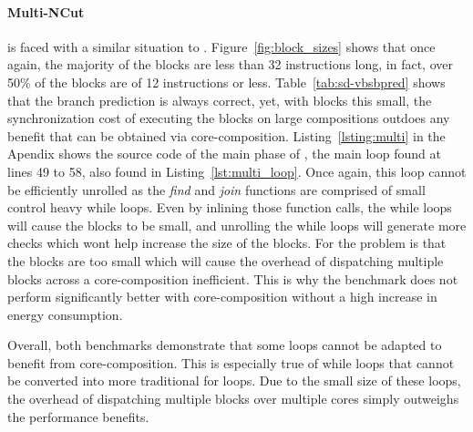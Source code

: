 \paragraph*{Multi-NCut}
 is faced with a similar situation to .
Figure~\ref{fig:block_sizes} shows that once again, the majority of the blocks are less than 32 instructions long, in fact, over 50\% of the blocks are of 12 instructions or less.
Table~\ref{tab:sd-vbsbpred} shows that the branch prediction is always correct, yet, with blocks this small, the synchronization cost of executing the blocks on large compositions outdoes any benefit that can be obtained via core-composition.
Listing~\ref{lsting:multi} in the Apendix shows the source code of the main phase of , the main loop found at lines 49 to 58, also found in Listing~\ref{lst:multi_loop}.
Once again, this loop cannot be efficiently unrolled as the \textit{find} and \textit{join} functions are comprised of small control heavy while loops.
Even by inlining those function calls, the while loops will cause the blocks to be small, and unrolling the while loops will generate more checks which wont help increase the size of the blocks.
For  the problem is that the blocks are too small which will cause the overhead of dispatching multiple blocks across a core-composition inefficient.
This is why the benchmark does not perform significantly better with core-composition without a high increase in energy consumption.

Overall, both benchmarks demonstrate that some loops cannot be adapted to benefit from core-composition.
This is especially true of while loops that cannot be converted into more traditional for loops.
Due to the small size of these loops, the overhead of dispatching multiple blocks over multiple cores simply outweighs the performance benefits.